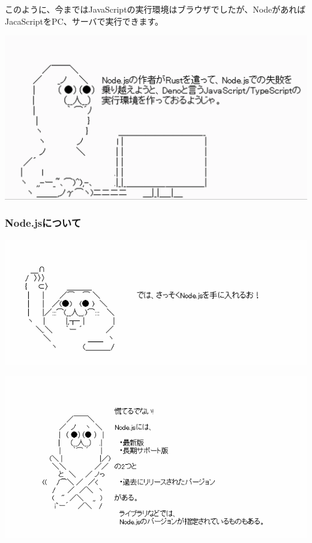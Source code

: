 このように、今まではJavaScriptの実行環境はブラウザでしたが、NodeがあればJacaScriptをPC、サーバで実行できます。

\begin{reviewimage}[H]%
\includegraphics[width=0.6\maxwidth]{./images/01-createDevEnv/denojs.png}%
\label{image:01-createDevEnv:denojs}
\end{reviewimage}

\clearpage


\subsubsection*{Node.jsについて}
\keeplastskip{
  \label{sec:1-1-1-2}
  \par\nobreak
}
\begin{reviewimage}%
\includegraphics[width=1.0\maxwidth]{./images/01-createDevEnv/y01_getNodejs.png}%
\label{image:01-createDevEnv:y01_getNodejs}
\end{reviewimage}
\begin{reviewimage}%
\includegraphics[width=1.0\maxwidth]{./images/01-createDevEnv/yr01_aboutNodejs.png}%
\label{image:01-createDevEnv:yr01_aboutNodejs}
\end{reviewimage}

